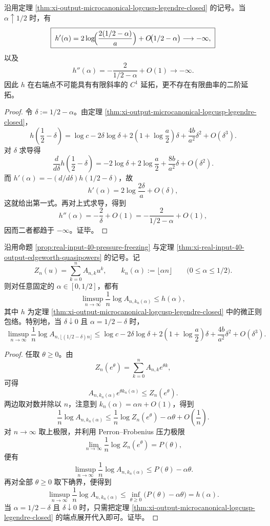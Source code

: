 \begin{corollary}[零温端点微正则包络的斜率与曲率同时发散]\label{cor:xi-output-microcanonical-endpoint-slope-curvature-diverge}
沿用定理 \ref{thm:xi-output-microcanonical-logcusp-legendre-closed} 的记号。当 \(\alpha\uparrow 1/2\) 时，有
\[
\boxed{\;
h'(\alpha)
=
2\log\!\Bigl(\frac{2(1/2-\alpha)}{a}\Bigr)
+O\!\bigl(1/2-\alpha\bigr)
\longrightarrow -\infty,
\;}
\]
以及
\[
\boxed{\;
h''(\alpha)
=
-\frac{2}{1/2-\alpha}+O(1)
\longrightarrow -\infty.
\;}
\]
因此 \(h\) 在右端点不可能具有有限斜率的 \(C^1\) 延拓，更不存在有限曲率的二阶延拓。
\end{corollary}
\begin{proof}
令 \(\delta:=1/2-\alpha\)。由定理 \ref{thm:xi-output-microcanonical-logcusp-legendre-closed}，
\[
h\!\left(\frac12-\delta\right)
=
\log c
-2\delta\log\delta
+2\left(1+\log\frac{a}{2}\right)\delta
+\frac{4b}{a^2}\delta^2
+O(\delta^3).
\]
对 \(\delta\) 求导得
\[
\frac{d}{d\delta}
h\!\left(\frac12-\delta\right)
=
-2\log\delta
+2\log\frac{a}{2}
+\frac{8b}{a^2}\delta
+O(\delta^2).
\]
而 \(h'(\alpha)=-(d/d\delta)h(1/2-\delta)\)，故
\[
h'(\alpha)
=
2\log\frac{2\delta}{a}+O(\delta),
\]
这就给出第一式。再对上式求导，得到
\[
h''(\alpha)
=
-\frac{2}{\delta}+O(1)
=
-\frac{2}{1/2-\alpha}+O(1),
\]
因而二者都趋于 \(-\infty\)。证毕。
\end{proof}

\begin{theorem}\label{thm:xi-near-ground-shell-counting-legendre-upper-bound}
沿用命题 \ref{prop:real-input-40-pressure-freezing} 与定理 \ref{thm:xi-real-input-40-output-edgeworth-quasipowers} 的记号。记
\[
Z_n(u)=\sum_{k=0}^{n}A_{n,k}u^k,
\qquad
k_n(\alpha):=\lfloor \alpha n\rfloor
\qquad
\bigl(0\le \alpha\le 1/2\bigr).
\]
则对任意固定的 \(\alpha\in[0,1/2]\)，都有
\[
\boxed{\;
\limsup_{n\to\infty}\frac{1}{n}\log A_{n,k_n(\alpha)}
\le
h(\alpha),
\;}
\]
其中 \(h\) 为定理 \ref{thm:xi-output-microcanonical-logcusp-legendre-closed} 中的微正则包络。特别地，当 \(\delta\downarrow 0\) 且 \(\alpha=1/2-\delta\) 时，
\[
\boxed{\;
\limsup_{n\to\infty}\frac{1}{n}\log A_{n,\lfloor(1/2-\delta)n\rfloor}
\le
\log c
-2\delta\log\delta
+2\left(1+\log\frac{a}{2}\right)\delta
+\frac{4b}{a^2}\delta^2
+O(\delta^3).
\;}
\]
\end{theorem}
\begin{proof}
任取 \(\theta\ge 0\)。由
\[
Z_n(e^\theta)=\sum_{k=0}^{n}A_{n,k}e^{\theta k},
\]
可得
\[
A_{n,k_n(\alpha)}e^{\theta k_n(\alpha)}
\le
Z_n(e^\theta).
\]
两边取对数并除以 \(n\)，注意到 \(k_n(\alpha)=\alpha n+O(1)\)，得到
\[
\frac{1}{n}\log A_{n,k_n(\alpha)}
\le
\frac{1}{n}\log Z_n(e^\theta)-\alpha\theta+O\!\left(\frac{1}{n}\right).
\]
对 \(n\to\infty\) 取上极限，并利用 Perron--Frobenius 压力极限
\[
\lim_{n\to\infty}\frac{1}{n}\log Z_n(e^\theta)=P(\theta),
\]
便有
\[
\limsup_{n\to\infty}\frac{1}{n}\log A_{n,k_n(\alpha)}
\le
P(\theta)-\alpha\theta.
\]
再对全部 \(\theta\ge 0\) 取下确界，便得到
\[
\limsup_{n\to\infty}\frac{1}{n}\log A_{n,k_n(\alpha)}
\le
\inf_{\theta\ge 0}\bigl(P(\theta)-\alpha\theta\bigr)
=
h(\alpha).
\]
当 \(\alpha=1/2-\delta\) 且 \(\delta\downarrow 0\) 时，只需把定理
\ref{thm:xi-output-microcanonical-logcusp-legendre-closed} 的端点展开代入即可。证毕。
\end{proof}

